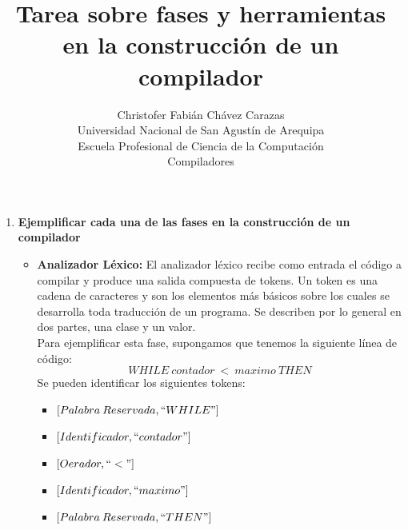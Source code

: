 \documentclass[a4paper,12pt]{article}
\begin{document}
\title{Tarea sobre fases y herramientas en la construcción de un compilador}
\author{
Christofer Fabián Chávez Carazas \\
\small{Universidad Nacional de San Agustín de Arequipa} \\
\small{Escuela Profesional de Ciencia de la Computación} \\
\small{Compiladores}
}
\date{}

\maketitle

\begin{enumerate}
 \item \textbf{Ejemplificar cada una de las fases en la construcción de un compilador}
 
 \begin{itemize}
  \item \textbf{Analizador Léxico:} El analizador léxico recibe como entrada el código a compilar y produce una
  salida compuesta de tokens. Un token es una cadena de caracteres y son los elementos más básicos sobre los cuales
  se desarrolla toda traducción de un programa. Se describen por lo general en dos partes, una clase y un valor. \\
  Para ejemplificar esta fase, supongamos que tenemos la siguiente línea de código:
  $$WHILE\:contador\:<\:maximo\:THEN$$
  Se pueden identificar los siguientes tokens:
  \begin{itemize}
   \item $[Palabra\:Reservada,``WHILE"]$
   \item $[Identificador,``contador"]$
   \item $[Oerador,``<"]$
   \item $[Identificador, ``maximo"]$
   \item $[Palabra\:Reservada,``THEN"]$
  \end{itemize}


\end{itemize}
\end{enumerate}
\end{document}
